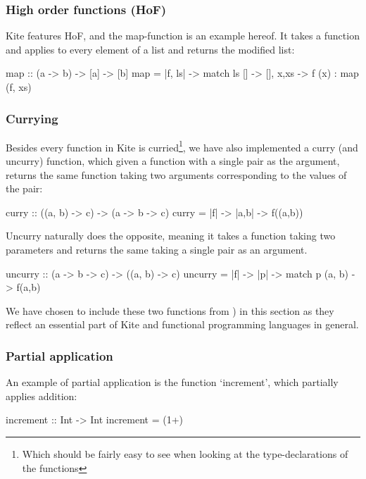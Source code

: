 \subsubsection{High order functions (HoF)}
Kite features HoF, and the map-function is an example hereof. It takes a function and applies to every element of a list and returns the modified list:

\begin{kite}
map :: (a -> b) -> [a] -> [b]
map = |f, ls| -> {
  match ls {
    [] -> [],
    x,xs -> f (x) : map (f, xs)
  }
}
\end{kite}

\subsubsection{Currying}
\label{subsubsec:currying}
Besides every function in Kite is curried\footnote{Which should be fairly easy to see when looking at the type-declarations of the functions}, we have also implemented a curry (and uncurry) function, which given a function with a single pair as the argument, returns the same function taking two arguments corresponding to the values of the pair:

\begin{kite}
curry :: ((a, b) -> c) -> (a -> b -> c)
curry = |f| -> {
  |a,b| -> {
    f((a,b))
  }       
}
\end{kite}

Uncurry naturally does the opposite, meaning it takes a function taking two parameters and returns the same taking a single pair as an argument.

\begin{kite}
uncurry :: (a -> b -> c) -> ((a, b) -> c)
uncurry = |f| -> {
  |p| -> {
    match p {
      (a, b) -> f(a,b)
    }         
  } 
}
\end{kite}

We have chosen to include these two functions from ) in this section as they reflect an essential part of Kite and functional programming languages in general.

\subsubsection{Partial application}

An example of partial application is the function `increment', which partially applies addition:

\begin{kite}
increment :: Int -> Int
increment = (1+)
\end{kite}

